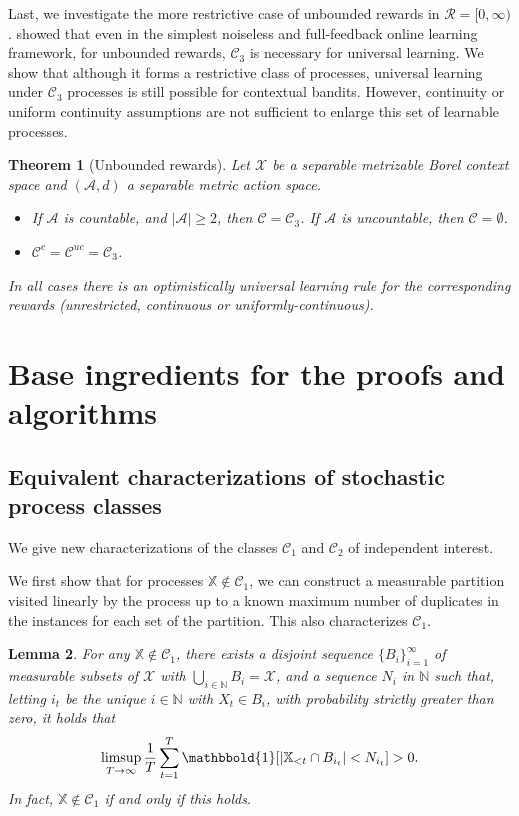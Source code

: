 \documentclass[aos]{imsart}
\theoremstyle{plain}
\newtheorem{theorem}{Theorem}[section]
\newtheorem{lemma}[theorem]{Lemma}
\theoremstyle{remark}
\newcommand{\Acal}{\mathcal{A}}
\newcommand{\Ccal}{\mathcal{C}}
\newcommand{\Rcal}{\mathcal{R}}
\newcommand{\Xcal}{\mathcal{X}}
\newcommand{\Xbb}{\mathbb{X}}
\newcommand{\1}{\mathbbm{1}}%
\newcommand{\X}{\mathcal X}
\newcommand{\nats}{\mathbb{N}}
\renewcommand{\limsup}{\mathop{\rm limsup}}
\newcommand{\ind}{\mathbbold{1}}
\newcommand{\ProcX}{\mathbb{X}}
\newcommand{\KC}{\mathcal{C}_{1}}
\begin{document}
Last, we investigate the more restrictive case of unbounded rewards in $\Rcal=[0,\infty)$. \cite{blanchard:22c} showed that even in the simplest noiseless and full-feedback online learning framework, for unbounded rewards, $\Ccal_3$ is necessary for universal learning. We show that although it forms a restrictive class of processes, universal learning under $\Ccal_3$ processes is still possible for contextual bandits. However, continuity or uniform continuity assumptions are not sufficient to enlarge this set of learnable processes.

\begin{theorem}[Unbounded rewards]\label{thm:unbounded}
    Let $\Xcal$ be a separable metrizable Borel context space and $(\Acal,d)$ a separable metric action space.
    \begin{itemize}
        \item  If $\Acal$ is countable, and $|\Acal|\geq 2$, then $\Ccal = \Ccal_3$. If $\Acal$ is uncountable, then $\Ccal=\emptyset$.
        \item $\Ccal^c=\Ccal^{uc} = \Ccal_3$.
    \end{itemize}
    In all cases there is an optimistically universal learning rule for the corresponding rewards (unrestricted, continuous or  uniformly-continuous).
\end{theorem}

\section{Base ingredients for the proofs and algorithms}
\label{sec:ingredients}

\subsection{Equivalent characterizations of stochastic process classes}
We give new characterizations of the classes $\Ccal_1$ and $\Ccal_2$ of independent interest.

We first show that for processes $\Xbb\notin\Ccal_1$, we can construct a measurable partition visited linearly by the process up to a known maximum number of duplicates in the instances for each set of the partition. This also characterizes $\Ccal_1$.

\begin{lemma}
\label{lem:infrequent-cells}
For any $\ProcX \notin \KC$, there exists a 
disjoint sequence $\{B_i\}_{i=1}^{\infty}$ of measurable subsets of $\X$ 
with $\bigcup\limits_{i \in \nats} B_i = \X$, 
and a sequence $N_i$ in $\nats$ 
such that, letting $i_t$ be the unique $i \in \nats$ 
with $X_t \in B_i$, 
with probability strictly greater than zero, it holds that
\begin{equation*}
\limsup_{T \to \infty} \frac{1}{T} \sum_{t=1}^{T} \ind\!\left[ |\Xbb_{<t} \cap B_{i_t}| < N_{i_t} \right] > 0.    
\end{equation*}
In fact, $\ProcX \notin \KC$ if and only if this holds.
\end{lemma}
\end{document}
